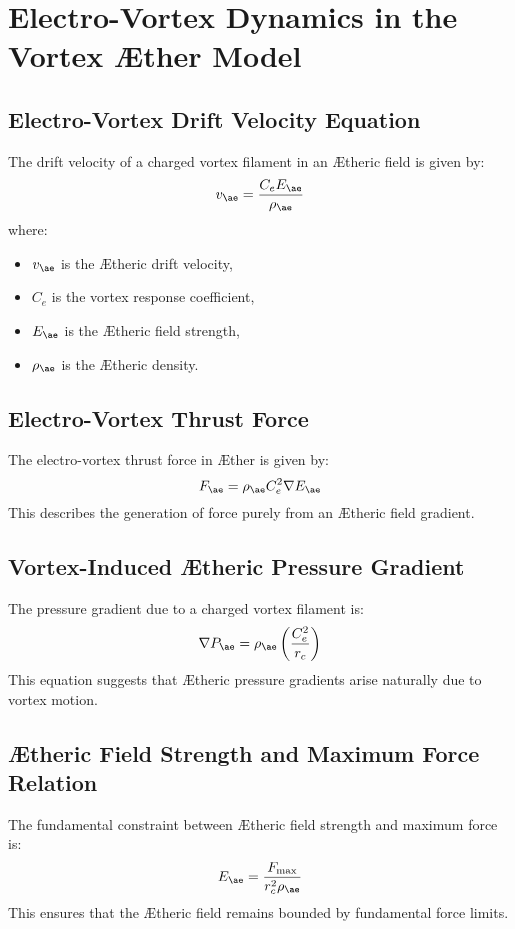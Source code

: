 \section{Electro-Vortex Dynamics in the Vortex \AE ther Model}

\subsection{Electro-Vortex Drift Velocity Equation}
The drift velocity of a charged vortex filament in an \AE theric field is given by:
\begin{equation}
    v_{\ae} = \frac{C_e E_{\ae}}{\rho_{\ae}}
\end{equation}
where:
\begin{itemize}
    \item $v_{\ae}$ is the \AE theric drift velocity,
    \item $C_e$ is the vortex response coefficient,
    \item $E_{\ae}$ is the \AE theric field strength,
    \item $\rho_{\ae}$ is the \AE theric density.
\end{itemize}

\subsection{Electro-Vortex Thrust Force}
The electro-vortex thrust force in \AE ther is given by:
\begin{equation}
    F_{\ae} = \rho_{\ae} C_e^2 \nabla E_{\ae}
\end{equation}
This describes the generation of force purely from an \AE theric field gradient.

\subsection{Vortex-Induced \AE theric Pressure Gradient}
The pressure gradient due to a charged vortex filament is:
\begin{equation}
    \nabla P_{\ae} = \rho_{\ae} \left( \frac{C_e^2}{r_c} \right)
\end{equation}
This equation suggests that \AE theric pressure gradients arise naturally due to vortex motion.

\subsection{\AE theric Field Strength and Maximum Force Relation}
The fundamental constraint between \AE theric field strength and maximum force is:
\begin{equation}
    E_{\ae} = \frac{F_{\max}}{r_c^2 \rho_{\ae}}
\end{equation}
This ensures that the \AE theric field remains bounded by fundamental force limits.

